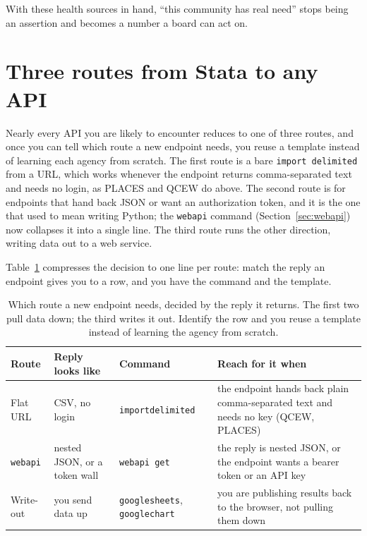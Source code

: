 \documentclass[
    a4paper,
    fontsize=10pt,
    twoside=true,
    numbers=noenddot,
]{kaobook}
\begin{document}
With these health sources in hand, \enquote{this community has real need} stops being an assertion and becomes a number a board can act on.

\section{Three routes from Stata to any API}\label{sec:threeroutes}
Nearly every API you are likely to encounter reduces to one of three routes, and once you can tell which route a new endpoint needs, you reuse a template instead of learning each agency from scratch. The first route is a bare \texttt{import delimited} from a URL, which works whenever the endpoint returns comma-separated text and needs no login, as PLACES and QCEW do above. The second route is for endpoints that hand back JSON or want an authorization token, and it is the one that used to mean writing Python; the \texttt{webapi} command (Section~\ref{sec:webapi}) now collapses it into a single line. The third route runs the other direction, writing data out to a web service.

Table~\ref{tab:ch03-viz-routes} compresses the decision to one line per route: match the reply an endpoint gives you to a row, and you have the command and the template.

\begin{table}[htbp]
\centering
\footnotesize
\begin{tabular}{@{}p{1.9cm}p{2.9cm}p{2.8cm}p{7.0cm}@{}}
\toprule
Route & Reply looks like & Command & Reach for it when \\
\midrule
Flat URL & CSV, no login & \texttt{import}\newline\texttt{delimited} & the endpoint hands back plain comma-separated text and needs no key (QCEW, PLACES) \\
\addlinespace
\texttt{webapi} & nested JSON, or a token wall & \texttt{webapi get} & the reply is nested JSON, or the endpoint wants a bearer token or an API key \\
\addlinespace
Write-out & you send data up & \texttt{googlesheets}, \texttt{googlechart} & you are publishing results back to the browser, not pulling them down \\
\bottomrule
\end{tabular}
\caption[Three routes from Stata to any API]{Which route a new endpoint needs, decided by the reply it returns. The first two pull data down; the third writes it out. Identify the row and you reuse a template instead of learning the agency from scratch.}
\label{tab:ch03-viz-routes}
\end{table}
\end{document}
